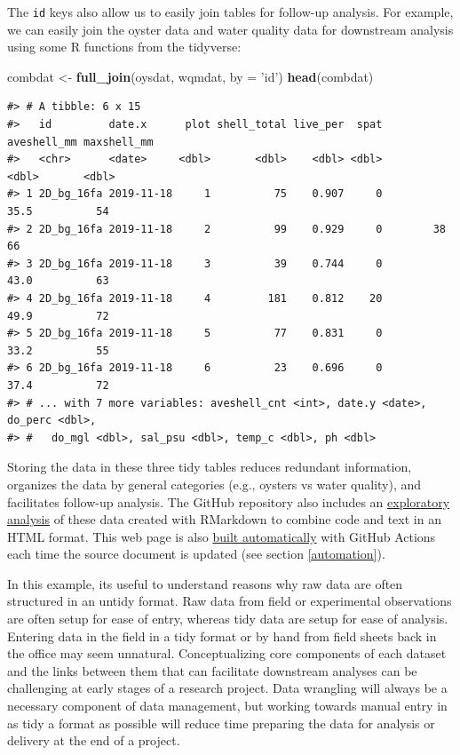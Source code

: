 \documentclass[
]{book}
\newenvironment{Shaded}{\begin{snugshade}}{\end{snugshade}}
\newcommand{\DataTypeTok}[1]{\textcolor[rgb]{0.13,0.29,0.53}{#1}}
\newcommand{\KeywordTok}[1]{\textcolor[rgb]{0.13,0.29,0.53}{\textbf{#1}}}
\newcommand{\NormalTok}[1]{#1}
\newcommand{\StringTok}[1]{\textcolor[rgb]{0.31,0.60,0.02}{#1}}
\begin{document}
The \texttt{id} keys also allow us to easily join tables for follow-up analysis. For example, we can easily join the oyster data and water quality data for downstream analysis using some R functions from the tidyverse:

\begin{Shaded}
\begin{Highlighting}[]
\NormalTok{combdat <-}\StringTok{ }\KeywordTok{full_join}\NormalTok{(oysdat, wqmdat, }\DataTypeTok{by =} \StringTok{'id'}\NormalTok{)}
\KeywordTok{head}\NormalTok{(combdat)}
\end{Highlighting}
\end{Shaded}

\begin{verbatim}
#> # A tibble: 6 x 15
#>   id         date.x      plot shell_total live_per  spat aveshell_mm maxshell_mm
#>   <chr>      <date>     <dbl>       <dbl>    <dbl> <dbl>       <dbl>       <dbl>
#> 1 2D_bg_16fa 2019-11-18     1          75    0.907     0        35.5          54
#> 2 2D_bg_16fa 2019-11-18     2          99    0.929     0        38            66
#> 3 2D_bg_16fa 2019-11-18     3          39    0.744     0        43.0          63
#> 4 2D_bg_16fa 2019-11-18     4         181    0.812    20        49.9          72
#> 5 2D_bg_16fa 2019-11-18     5          77    0.831     0        33.2          55
#> 6 2D_bg_16fa 2019-11-18     6          23    0.696     0        37.4          72
#> # ... with 7 more variables: aveshell_cnt <int>, date.y <date>, do_perc <dbl>,
#> #   do_mgl <dbl>, sal_psu <dbl>, temp_c <dbl>, ph <dbl>
\end{verbatim}

Storing the data in these three tidy tables reduces redundant information, organizes the data by general categories (e.g., oysters vs water quality), and facilitates follow-up analysis. The GitHub repository also includes an \href{https://tbep-tech.github.io/tberf-oyster/figures.html}{exploratory analysis} of these data created with RMarkdown \citep{Xie18} to combine code and text in an HTML format. This web page is also \href{https://github.com/tbep-tech/tberf-oyster/actions}{built automatically} with GitHub Actions each time the source document is updated (see section \ref{automation}).

In this example, its useful to understand reasons why raw data are often structured in an untidy format. Raw data from field or experimental observations are often setup for ease of entry, whereas tidy data are setup for ease of analysis. Entering data in the field in a tidy format or by hand from field sheets back in the office may seem unnatural. Conceptualizing core components of each dataset and the links between them that can facilitate downstream analyses can be challenging at early stages of a research project. Data wrangling will always be a necessary component of data management, but working towards manual entry in as tidy a format as possible will reduce time preparing the data for analysis or delivery at the end of a project.
\end{document}
